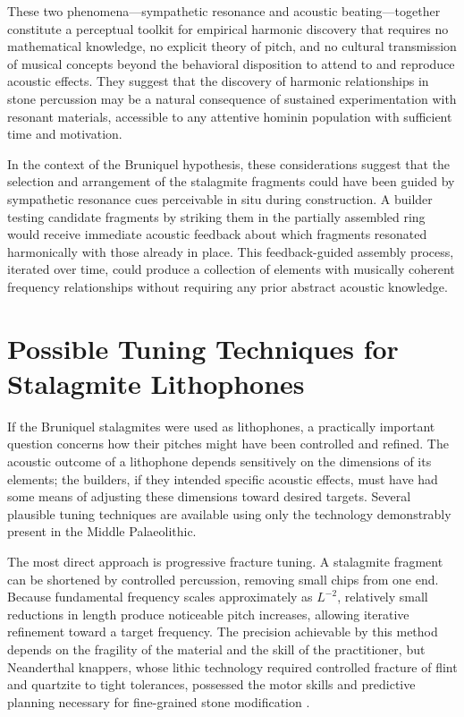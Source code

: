 \documentclass[12pt]{article}
\begin{document}
These two phenomena—sympathetic resonance and acoustic beating—together constitute a perceptual toolkit for empirical harmonic discovery that requires no mathematical knowledge, no explicit theory of pitch, and no cultural transmission of musical concepts beyond the behavioral disposition to attend to and reproduce acoustic effects. They suggest that the discovery of harmonic relationships in stone percussion may be a natural consequence of sustained experimentation with resonant materials, accessible to any attentive hominin population with sufficient time and motivation.

In the context of the Bruniquel hypothesis, these considerations suggest that the selection and arrangement of the stalagmite fragments could have been guided by sympathetic resonance cues perceivable in situ during construction. A builder testing candidate fragments by striking them in the partially assembled ring would receive immediate acoustic feedback about which fragments resonated harmonically with those already in place. This feedback-guided assembly process, iterated over time, could produce a collection of elements with musically coherent frequency relationships without requiring any prior abstract acoustic knowledge.

\section{Possible Tuning Techniques for Stalagmite Lithophones}

If the Bruniquel stalagmites were used as lithophones, a practically important question concerns how their pitches might have been controlled and refined. The acoustic outcome of a lithophone depends sensitively on the dimensions of its elements; the builders, if they intended specific acoustic effects, must have had some means of adjusting these dimensions toward desired targets. Several plausible tuning techniques are available using only the technology demonstrably present in the Middle Palaeolithic.

The most direct approach is progressive fracture tuning. A stalagmite fragment can be shortened by controlled percussion, removing small chips from one end. Because fundamental frequency scales approximately as $L^{-2}$, relatively small reductions in length produce noticeable pitch increases, allowing iterative refinement toward a target frequency. The precision achievable by this method depends on the fragility of the material and the skill of the practitioner, but Neanderthal knappers, whose lithic technology required controlled fracture of flint and quartzite to tight tolerances, possessed the motor skills and predictive planning necessary for fine-grained stone modification \citep{Wil2019}.
\end{document}
